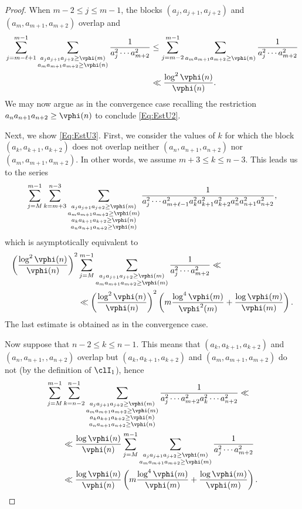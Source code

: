 \documentclass[12pt,a4paper]{amsart}
\begin{document}
\begin{proof}
When $m - 2 \leq j \leq m-1$, the blocks $(a_j,a_{j+1}, a_{j+2})$ and $(a_m,a_{m+1}, a_{m+2})$ overlap and
\begin{align*}
\sum_{j=m - \ell +1}^{m-1} 
\sum_{\substack{ a_j a_{j+1} a_{j+2}\geq \vphi(m) \\ a_m a_{m+1} a_{m+2}\geq \vphi(n)}}
\frac{1}{a_j^2 \cdots a_{m+2}^2}
&\leq 
\sum_{j=m - 2}^{m-1} 
\sum_{a_m a_{m+1} a_{m+2}\geq \vphi(n)}
\frac{1}{a_j^2 \cdots a_{m+2}^2}\\
&\ll
\frac{\log^{2}\vphi(n)}{\vphi(n)}.
\end{align*}
We may now argue as in the convergence case recalling the restriction $a_n a_{n+1} a_{n+2}\geq \vphi(n)$ to conclude \eqref{Eq:EstU2}.

Next, we show \eqref{Eq:EstU3}. First, we consider the values of $k$ for which the block $(a_k,a_{k+1}, a_{k+2})$ does not overlap neither $(a_n,a_{n+1}, a_{n+2})$ nor $(a_m,a_{m+1}, a_{m+2})$. In other words, we assume $m+3 \leq k \leq n-3$. This leads us to the series
\[
\sum_{j=M}^{m-1}
\sum_{k=m+3}^{n-3}
\sum_{\substack{a_j a_{j+1} a_{j+2} \geq \vphi(m)\\ a_m a_{m+1} a_{m+2}\geq \vphi(m)\\ a_k a_{k+1} a_{k+2}\geq \vphi(n)\\a_na_{n+1} a_{n+2}\geq \vphi(n)}}
\frac{1}{a_j^2 \cdots a_{m+\ell-1}^2 a_k^2 a_{k+1}^2 a_{k+2}^2 a_n^2a_{n+1}^2 a_{n+2}^2},
\]
which is asymptotically equivalent to
\begin{align*}
\left( \frac{\log^{2}\vphi(n)}{\vphi(n)}\right)^2
&\sum_{j=M}^{m-1}
\sum_{\substack{a_j a_{j+1} a_{j+2}\geq \vphi(m)\\ a_m a_{m+1} a_{m+2}\geq \vphi(m)}}
\frac{1}{a_j^2 \cdots a_{m+2}^2}
\ll \\
&\ll
\left( \frac{\log^{2}\vphi(n)}{\vphi(n)}\right)^2
\left( m \frac{\log^{4}\vphi(m)}{\vphi^2(m)} + \frac{\log\vphi(m)}{\vphi(m)}\right).
\end{align*}
The last estimate is obtained as in the convergence case. 

Now suppose that $n-2\leq k \leq n-1$. This means that $(a_k,a_{k+1}, a_{k+2})$ and $(a_n,a_{n+1},,a_{n+2} )$ overlap but $(a_k,a_{k+1}, a_{k + 2})$ and $(a_m,a_{m+1}, a_{m + 2})$ do not (by the definition of $\clI_1$), hence
\begin{align*}
\sum_{j=M}^{m-1}
&\sum_{k=n - 2}^{n-1}
\sum_{\substack{a_j a_{j+1} a_{j+2}\geq \vphi(m)\\ a_m a_{m+1} a_{m+2}\geq \vphi(m)\\ a_k a_{k+1} a_{k+2}\geq \vphi(n)\\ a_n a_{n+1} a_{n+2}\geq \vphi(n)}}
\frac{1}{a_j^2 \cdots a_{m + 2}^2a_k^2\cdots a_{n + 2}^2} \ll \\
&\ll
\frac{\log \vphi(n)}{\vphi(n)}
\sum_{j=M}^{m-1}
\sum_{\substack{a_ja_{j + 1} a_{j + 2}\geq \vphi(m) \\a_m a_{m+1} a_{m+2}\geq \vphi(m) }}
\frac{1}{a_j^2 \cdots a_{m+2}^2} \\
&\ll
\frac{\log \vphi(n)}{\vphi(n)}
\left( m \frac{\log^{4}\vphi(m)}{\vphi(m)} + \frac{\log \vphi(m)}{\vphi(m)}\right).
\end{align*}


\end{proof}
\end{document}
